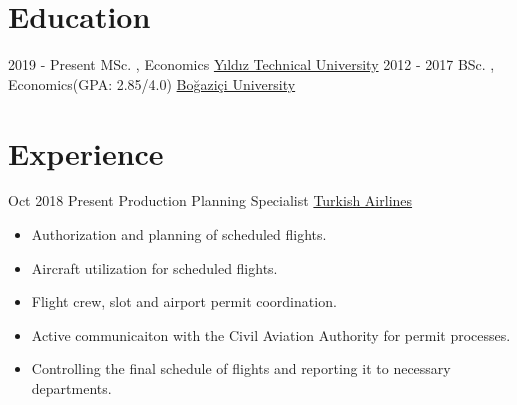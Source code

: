 \documentclass[letterpaper]{ramco_class} %
\begin{document}
\makeprofile %

\section{Education}

\begin{twenty} %
	\twentyitem
    	{2019 - Present}
        {}
        {\hspace{0.2cm}MSc. , Economics }
        {\href{http://www.ikt.yildiz.edu.tr/}{\hspace{0.27cm}Yıldız Technical University}}
        {}
        {}
   	\twentyitem
	    {2012 - 2017}
	    {}
	    {\hspace{0.23cm}BSc. , Economics\textnormal{(GPA: 2.85/4.0)}}
	    {\href{http://www.econ.boun.edu.tr/}{\hspace{0.27cm}Boğaziçi University}}
	    {}
	    {}
\end{twenty}


\section{Experience}

\begin{twenty} %
\twentyitem
    	{Oct 2018}
		{Present}
        {\hspace{0.3cm}Production Planning Specialist}
        {\href{https://www.turkishairlines.com/tr-int/}{Turkish Airlines}}
        {}
        {\begin{itemize}
        \item Authorization and planning of scheduled flights.
        \item Aircraft utilization for scheduled flights.
        \item Flight crew, slot and airport permit coordination.
				\item Active communicaiton with the Civil Aviation Authority for permit processes.
				\item Controlling the final schedule of flights and reporting it to necessary departments.
        \end{itemize}}
\end{twenty}
\end{document}
